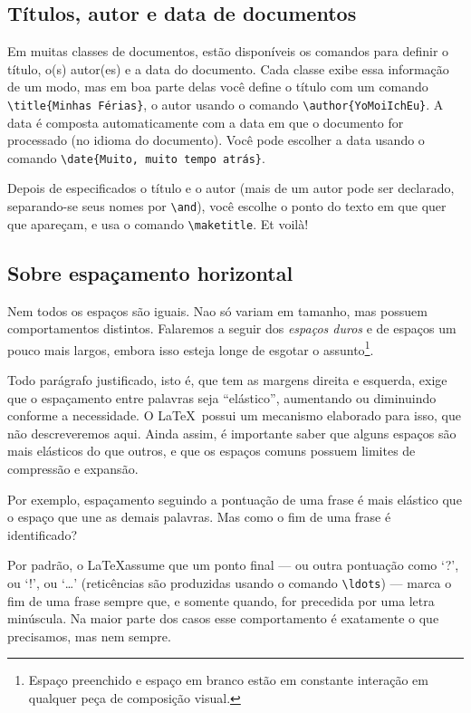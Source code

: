 \subsection{Títulos, autor e data de documentos}

Em muitas classes de documentos, estão disponíveis os comandos para
definir o título, o(s) autor(es) e a data do documento. Cada classe
exibe essa informação de um modo, mas em boa parte delas você define o
título com um comando \verb'\title{Minhas Férias}', o autor usando o
comando \verb'\author{YoMoiIchEu}'. A data é composta automaticamente
com a data em que o documento for processado (no idioma do
documento). Você pode escolher a data usando o comando
\verb'\date{Muito, muito tempo atrás}'.

Depois de especificados o título e o autor (mais de um autor pode ser
declarado, separando-se seus nomes por \verb'\and'), você escolhe o
ponto do texto em que quer que apareçam, e usa o comando
\verb'\maketitle'. Et voilà!

\subsection{Sobre espaçamento horizontal}

Nem todos os espaços são iguais. Nao só variam em tamanho, mas possuem
comportamentos distintos. Falaremos a seguir dos 
\emph{espaços duros}
e de espaços um pouco mais largos, embora isso esteja longe de esgotar
o assunto\footnote{Espaço preenchido e espaço em branco estão em
  constante interação em qualquer peça de composição visual.}.

Todo parágrafo justificado, isto é, que tem as margens direita e
esquerda, exige que o espaçamento entre palavras seja ``elástico'',
aumentando ou diminuindo conforme a necessidade. O \LaTeX\ possui um
mecanismo elaborado para isso, que não descreveremos aqui. Ainda
assim, é importante saber que alguns espaços são mais elásticos do que
outros, e que os espaços comuns possuem limites de compressão e
expansão.

Por exemplo, espaçamento seguindo a pontuação de uma frase é mais
elástico que o espaço que une as demais palavras. Mas como o fim de
uma frase é identificado?

Por padrão, o \LaTeX assume que um ponto final --- ou outra pontuação
como `?{}', ou `!{}', ou `\ldots'
(reticências são produzidas usando o
comando \verb'\ldots') --- marca o fim de uma
frase sempre que, e somente quando, for precedida por uma letra
minúscula. Na maior parte dos casos esse comportamento é exatamente o
que precisamos, mas nem sempre.

